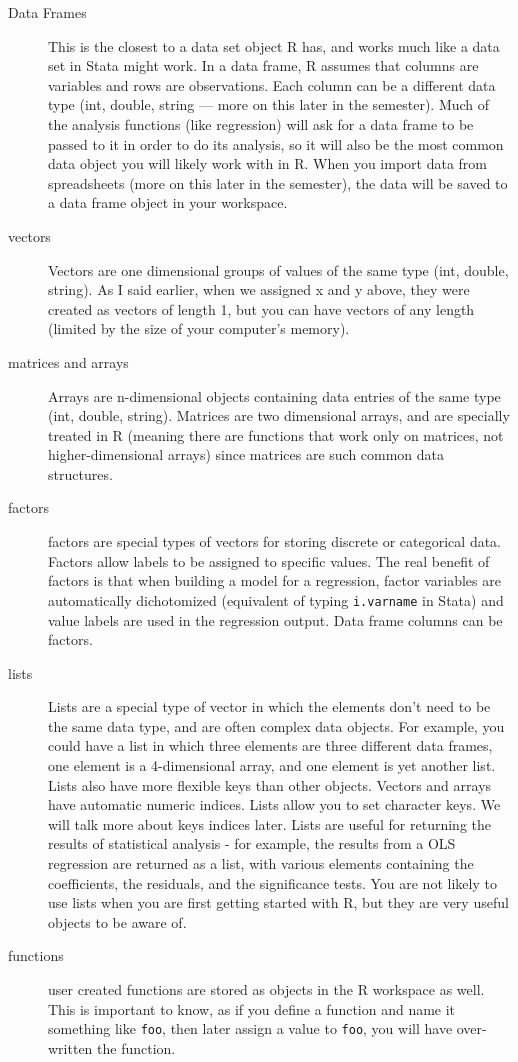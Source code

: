 \documentclass[12pt, oneside]{amsart}   	%
\begin{document}
\begin{description}
\item[Data Frames] This is the closest to a data set object R has, and works much like a data set in Stata might work. In a data frame, R assumes that columns are variables and rows are observations. Each column can be a different data type (int, double, string --- more on this later in the semester). Much of the analysis functions (like regression) will ask for a data frame to be passed to it in order to do its analysis, so it will also be the most common data object you will likely work with in R. When you import data from spreadsheets (more on this later in the semester), the data will be saved to a data frame object in your workspace. 
\item[vectors] Vectors are one dimensional groups of values of the same type (int, double, string). As I said earlier, when we assigned x and y above, they were created as vectors of length 1, but you can have vectors of any length (limited by the size of your computer's memory).
\item[matrices and arrays] Arrays are n-dimensional objects containing data entries of the same type (int, double, string). Matrices are two dimensional arrays, and are specially treated in R (meaning there are functions that work only on matrices, not higher-dimensional arrays) since matrices are such common data structures. 
\item[factors] factors are special types of vectors for storing discrete or categorical data. Factors allow labels to be assigned to specific values. The real benefit of factors is that when building a model for a regression, factor variables are automatically dichotomized (equivalent of typing \texttt{i.varname} in Stata) and value labels are used in the regression output. Data frame columns can be factors.
\item[lists] Lists are a special type of vector in which the elements don't need to be the same data type, and are often complex data objects. For example, you could have a list in which three elements are three different data frames, one element is a 4-dimensional array, and one element is yet another list. Lists also have more flexible keys than other objects. Vectors and arrays have automatic numeric indices. Lists allow you to set character keys. We will talk more about keys indices later. Lists are useful for returning the results of statistical analysis - for example, the results from a OLS regression are returned as a list, with various elements containing the coefficients, the residuals, and the significance tests. You are not likely to use lists when you are first getting started with R, but they are very useful objects to be aware of.
\item[functions] user created functions are stored as objects in the R workspace as well. This is important to know, as if you define a function and name it something like \texttt{foo}, then later assign a value to \texttt{foo}, you will have over-written the function. 
\end{description}
\end{document}
